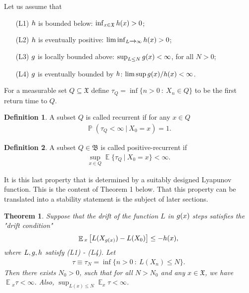 \documentclass[10pt, reqno]{amsart}
\newtheorem*{theorem*}{Theorem}
\theoremstyle{definition}
\newtheorem{definition}{Definition}[section]
\newcommand{\aasVar}{Q} %
\newcommand{\asaVar}{\mathfrak{B}} %
\newcommand{\astVar}{\tau} %
\newcommand{\ltfVar}{L} %
\newcommand{\assVar}{\mathfrak{X}} %
\DeclareMathOperator*{\E}{\mathbb{E}}
\DeclareMathOperator*{\Pb}{\mathbb{P}}
\begin{document}
	Let us assume that
	\begin{enumerate}
		\item[(L1)] $h$ is bounded below: $\inf_{x \in \assVar}\hffVar(x) > 0$;
		\item[(L2)] $h$ is eventually positive: $\liminf_{\ltfVar \xrightarrow{} \infty}\hffVar(x) > 0$;
		\item[(L3)] $g$ is locally bounded above: $\sup_{\ltfVar \leq N}\gffVar(x) < \infty$, for all $N > 0$;
		\item[(L4)] $g$ is eventually bounded by $h$: $\limsup g(x)/h(x) < \infty$.
	\end{enumerate}
	For a measurable set $\aasVar \subseteq \assVar$ define $\astVar_{\aasVar} = \inf\{n > 0 \: : \: X_{n} \in \aasVar\}$ to be the first return time to $\aasVar$. 
	\begin{definition}
		A subset $\aasVar$ is called recurrent if for any $x \in \aasVar$
		\begin{gather*}
		\Pb(\astVar_{\aasVar} < \infty \: | \: X_{0} = x) = 1.
		\end{gather*}
	\end{definition}
	\begin{definition}
		A subset $\aasVar \in \asaVar$ is called positive-recurrent if
		\begin{gather}
		\sup_{x \in \aasVar}\E\{\astVar_{\aasVar} \: | \: X_{0} = x\} < \infty.
		\end{gather}
	\end{definition}
	It is this last property that is determined by a suitably designed Lyapunov function. This is the content of Theorem 1 below. That this property can be translated into a stability statement is the subject of later sections.
	\begin{theorem*}
		Suppose that the drift of the function $\ltfVar$ in $g(x)$ steps satisfies the "drift condition"
		\begin{gather*}
		\E{}_{x}\left[\ltfVar(X_{\gffVar(x)}) - \ltfVar(X_{0})\right] \leq -\hffVar(x),
		\end{gather*}
		where $\ltfVar, \gffVar, \hffVar$ satisfy (L1) - (L4). Let
		\begin{gather*}
		\astVar \equiv \astVar_{N} = \inf\{n > 0 \: :  \: \ltfVar(X_{n}) \leq N\}.
		\end{gather*}
		Then there exists $N_{0} > 0$, such that for all $N > N_{0}$ and any $x \in \assVar$, we have $\E{}_{x}\astVar < \infty$. Also, $\sup_{\ltfVar(x) \leq N}\E_{x}\astVar < \infty$.
	\end{theorem*}
\end{document}
